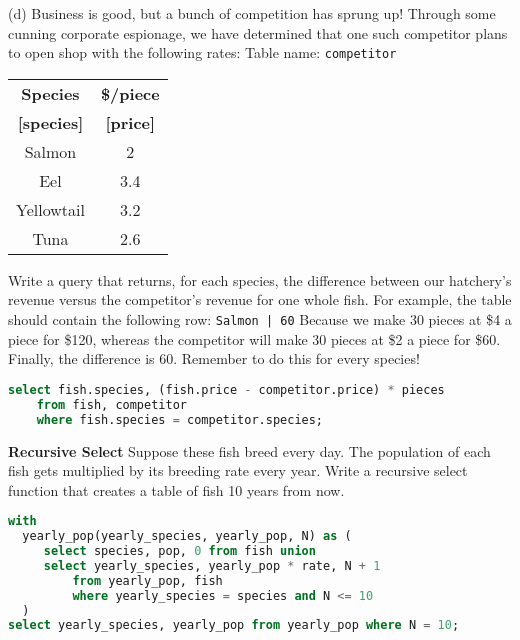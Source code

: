 \documentclass{exam}
\begin{document}
\begin{questions}
\begin{blocksection}
(d) Business is good, but a bunch of competition has sprung up! Through some cunning corporate espionage, we have determined that one such competitor plans to open shop with the following rates:\newline
\newline
Table name: \texttt{competitor}
\begin{center}
\begin{tabular}{ |c|c| }
 \hline
 \textbf{Species} & \textbf{\$/piece} \\
  \textbf{[species]} & \textbf{[price]} \\
 \hline
 Salmon & 2 \\
 \hline
 Eel & 3.4 \\
 \hline
  Yellowtail & 3.2  \\
 \hline
 Tuna & 2.6  \\
 \hline
\end{tabular}
\end{center}
Write a query that returns, for each species, the difference between our hatchery’s revenue versus the competitor’s revenue for one whole fish. For example, the table should contain the following row: \newline
\texttt{Salmon | 60} \newline \newline
Because we make 30 pieces at \$4 a piece for \$120, whereas the competitor will make 30 pieces at \$2 a piece for \$60. Finally, the difference is 60. Remember to do this for every species!
\begin{solution}[1in]
\begin{lstlisting}[language=SQL]
select fish.species, (fish.price - competitor.price) * pieces
    from fish, competitor
    where fish.species = competitor.species;
\end{lstlisting}
\end{solution}


\end{blocksection}

\question \textbf{Recursive Select} Suppose these fish breed every day. The population of each fish gets multiplied by its breeding rate every year. Write a recursive select function that creates a table of fish 10 years from now.

\begin{solution}[0.5in]
\begin{lstlisting}[language=SQL]
with
  yearly_pop(yearly_species, yearly_pop, N) as (
     select species, pop, 0 from fish union
     select yearly_species, yearly_pop * rate, N + 1
         from yearly_pop, fish
         where yearly_species = species and N <= 10
  )
select yearly_species, yearly_pop from yearly_pop where N = 10;

\end{lstlisting}
\end{solution}


\end{questions}

\end{document}
